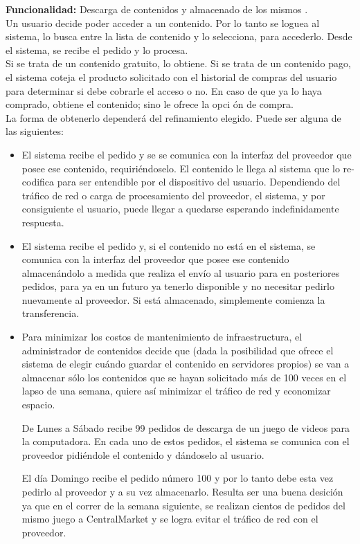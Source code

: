 \documentclass[11pt, a4paper, spanish]{article}
\begin{document}
	\textbf{Funcionalidad:} Descarga de contenidos y almacenado de los mismos .\\

	Un usuario decide poder acceder a un contenido. Por lo tanto se loguea al sistema, lo busca entre la lista de contenido y lo selecciona, para 
   accederlo. Desde el sistema, se recibe el pedido y lo procesa.\\

       Si se trata de un contenido gratuito, lo obtiene. Si se trata de un contenido pago, el sistema coteja el producto solicitado con el historial de 
   compras del usuario para determinar si debe cobrarle el acceso o no. En caso de que ya lo haya comprado, obtiene el contenido; sino le ofrece la opci
   \'on de compra.\\
   La forma de obtenerlo depender\'a del refinamiento elegido. Puede ser alguna de las siguientes:

	\begin{itemize}
	
	\item{ El sistema recibe el pedido y se se comunica con la interfaz del proveedor que posee ese contenido, requiri\'endoselo. El contenido le 
   llega al sistema que lo re-codifica para ser entendible por el dispositivo del usuario. Dependiendo del tr\'afico de red o carga de procesamiento 
   del proveedor, el sistema, y por consiguiente el usuario, puede llegar a quedarse esperando indefinidamente respuesta.}

	\item{ El sistema recibe el pedido y, si el contenido no est\'a en el sistema, se comunica con la interfaz del proveedor que posee ese 
   contenido almacen\'andolo a medida que realiza el env\'io al usuario para en posteriores pedidos, para ya en un futuro ya tenerlo disponible y no 
   necesitar pedirlo nuevamente al proveedor. Si est\'a almacenado, simplemente comienza la transferencia.}

	\item{ Para minimizar los costos de mantenimiento de infraestructura, el administrador de contenidos decide que (dada la posibilidad que ofrece 
   el sistema de elegir cu\'ando guardar el contenido en servidores propios) se van a almacenar s\'olo los contenidos que se hayan solicitado m\'as de 
   100 veces en el lapso de una semana, quiere as\'i minimizar el tr\'afico de red y economizar espacio.}

	De Lunes a S\'abado recibe 99 pedidos de descarga de un juego de videos para la computadora. En cada uno de estos pedidos, el sistema se 
   comunica con el proveedor pidi\'endole el contenido y d\'andoselo al usuario.

	El d\'ia Domingo recibe el pedido n\'umero 100 y por lo tanto debe esta vez pedirlo al proveedor y a su vez almacenarlo. Resulta ser una buena 
   desici\'on ya que en el correr de la semana siguiente, se realizan cientos de pedidos del mismo juego a CentralMarket y se logra evitar el tr\'afico 
   de red con el proveedor.

	\end{itemize}
\end{document}
